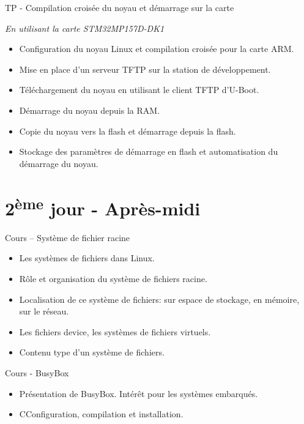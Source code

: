 \documentclass[a4paper,12pt,obeyspaces,spaces,hyphens]{article}
\begin{document}
\feagendaonecolumn
{TP - Compilation croisée du noyau et démarrage sur la carte}
{
  {\em En utilisant la carte STM32MP157D-DK1}
  \begin{itemize}
  \item Configuration du noyau Linux et compilation croisée pour la carte ARM.
  \item Mise en place d'un serveur TFTP sur la station de développement.
  \item Téléchargement du noyau en utilisant le client TFTP d'U-Boot.
  \item Démarrage du noyau depuis la RAM.
  \item Copie du noyau vers la flash et démarrage depuis la flash.
  \item Stockage des paramètres de démarrage en flash et automatisation
	du démarrage du noyau.
  \end{itemize}
}

\section{2\textsuperscript{ème} jour - Après-midi}

\feagendatwocolumn
{Cours – Système de fichier racine}
{
  \begin{itemize}
  \item Les systèmes de fichiers dans Linux.
  \item Rôle et organisation du système de fichiers racine.
  \item Localisation de ce système de fichiers: sur espace
	de stockage, en mémoire, sur le réseau.
  \item Les fichiers device, les systèmes de fichiers virtuels.
  \item Contenu type d'un système de fichiers.
  \end{itemize}
}
{Cours - BusyBox}
{
  \begin{itemize}
  \item Présentation de BusyBox. Intérêt pour les systèmes embarqués.
  \item CConfiguration, compilation et installation.
  \end{itemize}
}
\end{document}
